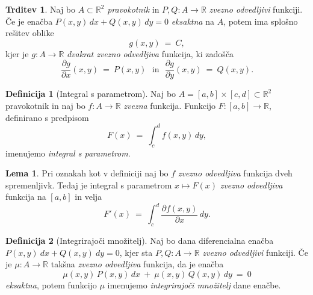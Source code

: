 \documentclass[11pt]{article}
\newcommand{\R}{\mathbb{R}}
\theoremstyle{definition}
\newtheorem{definicija}{Definicija}[section]
\theoremstyle{definition}
\newtheorem{trditev}{Trditev}[section]
\theoremstyle{definition}
\theoremstyle{theorem}
\newtheorem{lema}{Lema}
\begin{document}
\begin{trditev}

Naj bo $A \subset \R^2$ \textit{pravokotnik} in $P, Q: A \rightarrow \R$ \textit{zvezno odvedljivi} funkciji. Če je enačba $P(x, y)\,dx + Q(x, y)\,dy = 0$ \textit{eksaktna} na $A$, potem ima splošno rešitev oblike 
$$g(x, y) ~=~ C,$$
kjer je $g: A \rightarrow \R$ \textit{dvakrat zvezno odvedljiva} funkcija, ki zadošča
$$\frac{\partial g}{\partial x}(x, y) ~=~ P(x, y) ~~~\text{in}~~~ \frac{\partial g}{\partial y}(x, y) ~=~ Q(x, y).$$

\end{trditev}
\vspace{0.5cm}

\begin{definicija}[Integral s parametrom]

Naj bo $A = [a, b] \times [c, d] \subset \mathbb{R}^2$ pravokotnik in naj bo $f: A \rightarrow \mathbb{R}$ \textit{zvezna} funkcija. Funkcijo $F:[a, b] \rightarrow \mathbb{R}$, definirano s predpisom 
$$F(x) ~=~ \int_{c}^{d} f(x, y)\,dy,$$
imenujemo \textit{integral s parametrom}.

\end{definicija}
\vspace{0.5cm}

\begin{lema}

Pri oznakah kot v definiciji naj bo $f$ \textit{zvezno odvedljiva} funkcija dveh spremenljivk. Tedaj je integral s parametrom $x \mapsto F(x)$ \textit{zvezno odvedljiva} funkcija na $[a, b]$ in velja
$$F'(x) ~=~ \int_c^d \frac{\partial f(x, y)}{\partial x}\,dy.$$

\end{lema}
\vspace{0.5cm}

\begin{definicija}[Integrirajoči množitelj]

Naj bo dana diferencialna enačba $P(x, y)~dx + Q(x, y)~dy = 0$, kjer sta $P, Q: A \rightarrow \mathbb{R}$ \textit{zvezno odvedljivi} funkciji. Če je $\mu: A \rightarrow \mathbb{R}$ takšna \textit{zvezno odvedljiva} funkcija, da je enačba
$$\mu(x, y)\,P(x, y)\,dx ~+~ \mu(x, y)\,Q(x, y)\,dy ~=~ 0$$
\textit{eksaktna}, potem funkcijo $\mu$ imenujemo \textit{integrirajoči množitelj} dane enačbe.

\end{definicija}
\vspace{0.5cm}
\end{document}
